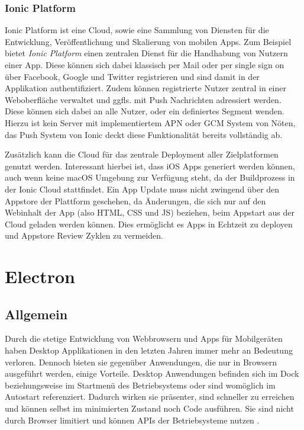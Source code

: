\subsubsection{Ionic Platform}

Ionic Platform ist eine Cloud, sowie eine Sammlung von Diensten für die Entwicklung,
Veröffentlichung und Skalierung von mobilen Apps. Zum Beispiel bietet \emph{Ionic Platform} einen zentralen Dienst für die Handhabung von Nutzern einer App.
Diese können sich dabei klassisch per Mail oder per single sign on über
Facebook, Google und Twitter registrieren und sind damit in der Applikation authentifiziert.
Zudem können registrierte Nutzer zentral in einer Weboberfläche verwaltet und ggfls. mit Push Nachrichten adressiert werden.
Diese können sich dabei an alle Nutzer, oder ein definiertes Segment wenden.
Hierzu ist kein Server mit implementiertem \ac{APN} oder \ac{GCM} System von Nöten, das Push System von Ionic deckt diese
Funktionalität bereits vollständig ab.

Zusätzlich kann die Cloud für das zentrale Deployment aller Zielplatformen genutzt werden.
Interessant hierbei ist, dass iOS Apps generiert werden können, auch wenn
keine macOS Umgebung zur Verfügung steht, da der Buildprozess in der Ionic Cloud stattfindet.
Ein App Update muss nicht zwingend über den Appstore der Plattform geschehen,
da Änderungen, die sich nur auf den Webinhalt der App (also HTML, CSS und JS) beziehen,
beim Appstart aus der Cloud geladen werden können.
Dies ermöglicht es Apps in Echtzeit zu deployen und Appstore Review Zyklen zu vermeiden.


\section{Electron}
\subsection{Allgemein}

Durch die stetige Entwicklung von Webbrowsern und Apps für Mobilgeräten haben Desktop Applikationen in den letzten Jahren immer mehr an Bedeutung verloren.
Dennoch bieten sie gegenüber Anwendungen, die nur in Browsern ausgeführt werden, einige Vorteile.
Desktop Anwendungen befinden sich im Dock beziehungsweise im Startmenü des Betriebsystems oder sind womöglich im Autostart referenziert.
Dadurch wirken sie präsenter, sind schneller zu erreichen und können selbst im minimierten Zustand noch Code ausführen.
Sie sind nicht durch Browser limitiert und können APIs der Betriebsysteme nutzen \cite{Build58:online}.

